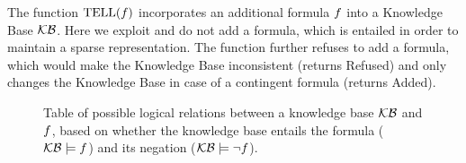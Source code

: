 The function $\mathrm{TELL}(f)$ incorporates an additional formula $f$ into a Knowledge Base $\mathcal{KB}$.
Here we exploit  and do not add a formula, which is entailed in order to maintain a sparse representation. %
The function further refuses to add a formula, which would make the Knowledge Base inconsistent (returns Refused) and only changes the Knowledge Base in case of a contingent formula (returns Added).


\begin{figure}
    \begin{center}
        
    \end{center}
    \caption{Table of possible logical relations between a knowledge base $\mathcal{KB}$ and $f$, based on whether the knowledge base entails the formula ($\mathcal{KB}\models f$) and its negation ($\mathcal{KB}\models\lnot f$).}\label{fig:askDecisionTable}
\end{figure}


